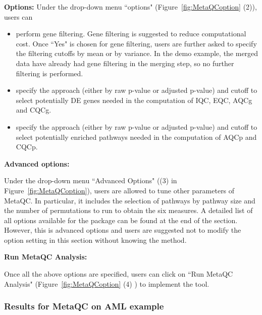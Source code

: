 \begin{steps}
\item \textbf{Options:}
Under the drop-down menu ``options" (Figure~\ref{fig:MetaQCoption} {\color{red}(2)}),
users can 

\begin{itemize}
\item perform gene filtering. Gene filtering is suggested to reduce computational cost. Once ``Yes" is chosen for gene filtering, users are further asked to specify the filtering cutoffs by mean or by variance. 
In the demo example, the merged data have already had gene filtering in the merging step, so no further filtering is performed. 
\item specify the approach (either by raw p-value or adjusted p-value) and cutoff to select potentially DE genes needed in the computation of IQC, EQC, AQCg and CQCg.
\item specify the approach (either by raw p-value or adjusted p-value) and cutoff to select potentially enriched pathways needed in the computation of AQCp and CQCp.
\end{itemize}

\item \textbf{Advanced options:}



Under the drop-down menu ``Advanced Options" ({\color{red}(3)} in Figure~\ref{fig:MetaQCoption}), users are allowed to tune other parameters of MetaQC.
In particular, it includes the selection of pathways by pathway size and the number of permutations to run to obtain the six measures. A detailed list of all options available for the package can be found at the end of the section. 
However, this is advanced options and users are suggested not to modify the option setting in this section without knowing the method. 

\item \textbf{Run MetaQC Analysis:}

Once all the above options are specified, users can click on ``Run MetaQC Analysis" (Figure~\ref{fig:MetaQCoption}  {\color{red}(4)}  ) to implement the tool. 

\end{steps}



\subsubsection{Results for MetaQC on AML example}

